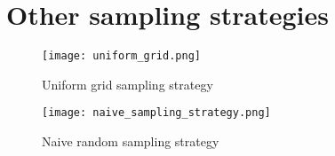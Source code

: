 \documentclass[11pt]{article}
\begin{document}
\fi

\begin{appendices}


\section{}\label{section: Appendix A}
\newpage
\section{Other sampling strategies}\label{section: Appendix B}
\begin{figure}[h!]
  \begin{center}
  \caption{Uniform grid sampling strategy} 
  \label{fig: uniform_grid}
  \texttt{[image: uniform\_grid.png]}
  \end{center}
  \end{figure}

  \begin{figure}[h!]
    \begin{center}
    \caption{Naive random sampling strategy} 
    \label{fig: random_sample}
    \texttt{[image: naive\_sampling\_strategy.png]}
    \end{center}
    \end{figure}

\end{appendices}
\ifdefined\COMPILINGMAIN
\else
\end{document}
